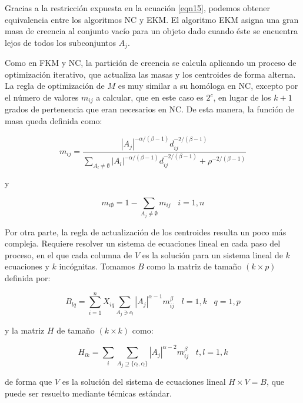Gracias a la restricción expuesta en la ecuación \ref{eqn15}, podemos obtener equivalencia entre los algoritmos \acs{NC} y \acs{EKM}. El algoritmo \acs{EKM} asigna una gran masa de creencia al conjunto vacío para un objeto dado cuando éste se encuentra lejos de todos los subconjuntos $A_j$.

Como en \acs{FKM} y \acs{NC}, la partición de creencia se calcula aplicando un proceso de optimización iterativo, que actualiza las masas  y los centroides de forma alterna. La regla de optimización de $M$ es muy similar a su homóloga en \acs{NC}, excepto por el número de valores $m_{ij}$ a calcular, que en este caso es $2^c$, en lugar de los $k + 1$ grados de pertenencia que eran necesarios en \acs{NC}. De esta manera, la función de masa queda definida como:

 \begin{equation}
m_{ij} = \frac{|A_j|^{-\alpha/(\beta-1)} d_{ij}^{-2/(\beta-1)}}{\sum_{A_l \ne \emptyset}|A_l|^{-\alpha/(\beta-1)} d_{ij}^{-2/(\beta-1)} + \rho^{-2/(\beta-1)}}
 \label{eqn16}
 \end{equation}
 
 y
 
\begin{equation}
m_{i\emptyset} = 1 - \sum_{A_j \ne \emptyset}m_{ij} \;\;\; i = 1,n
\label{eqn17}
\end{equation}

Por otra parte, la regla de actualización de los centroides resulta un poco más compleja. Requiere resolver un sistema de ecuaciones lineal en cada paso del proceso, en el que cada columna de $V$ es la solución para un sistema lineal de $k$ ecuaciones y $k$ incógnitas. Tomamos $B$ como la matriz de tamaño $(k \times p)$ definida por:

\begin{equation}
B_{lq} = \sum_{i=1}^{n} X_{iq} \sum_{A_j \ni c_l} |A_j|^{\alpha-1} m_{ij}^\beta \;\;\; l = 1,k \;\;\; q =1,p
\label{eqn18}
\end{equation}

y la matriz $H$ de tamaño $(k \times k)$ como:

\begin{equation}
H_{lk} = \sum_{i} \sum_{A_j \supseteq \{c_t,c_l\}} |A_j|^{\alpha - 2} m_{ij}^\beta \;\;\; t,l = 1,k
\label{eqn20}
\end{equation}

de forma que $V$ es la solución del sistema de ecuaciones lineal $H\times V = B$, que puede ser resuelto mediante técnicas estándar.

